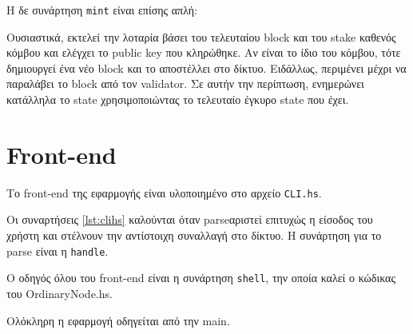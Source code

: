 \documentclass{article}
\newcommand{\eng}[1]{\foreignlanguage{english}{#1}} %
\begin{document}
Η δε συνάρτηση \texttt{\eng{mint}} είναι επίσης απλή:



Ουσιαστικά, εκτελεί την λοταρία βάσει του τελευταίου \eng{block} και του \eng{stake}
καθενός κόμβου και ελέγχει το \eng{public key} που κληρώθηκε. Αν είναι το ίδιο
του κόμβου, τότε δημιουργεί ένα νέο \eng{block} και το αποστέλλει στο δίκτυο.
Ειδάλλως, περιμένει μέχρι να παραλάβει το \eng{block} από τον \eng{validator}.
Σε αυτήν την περίπτωση, ενημερώνει κατάλληλα το \eng{state} χρησιμοποιώντας
το τελευταίο έγκυρο \eng{state} που έχει.

\section{\eng{Front-end}}

Το \eng{front-end} της εφαρμογής είναι υλοποιημένο στο αρχείο \texttt{\eng{CLI.hs}}.



Οι συναρτήσεις \ref{lst:clihs} καλούνται όταν \eng{parse}αριστεί επιτυχώς η είσοδος
του χρήστη και στέλνουν την αντίστοιχη συναλλαγή στο δίκτυο. Η συνάρτηση για το
\eng{parse} είναι η \texttt{\eng{handle}}.



Ο οδηγός όλου του \eng{front-end} είναι η συνάρτηση \texttt{\eng{shell}}, την οποία
καλεί ο κώδικας του \eng{OrdinaryNode.hs}.



Ολόκληρη η εφαρμογή οδηγείται από την \eng{main}.



\clearpage
\end{document}
